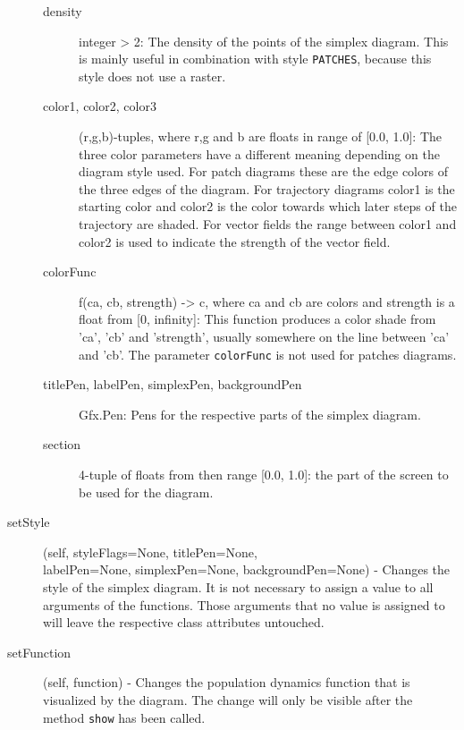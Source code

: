 \documentclass[12pt,a4paper,USenglish]{article}
\begin{document}
\begin{description}
\begin{description}
\item[density] integer > 2:  The density of the points of the simplex 
	diagram. This is mainly useful in combination with style {\tt PATCHES},
	because this style does not use a raster.

\item[color1, color2, color3] (r,g,b)-tuples, where r,g and b are
        floats in range of [0.0, 1.0]: The three color parameters have a
	different meaning depending on the diagram style used. 
	 For patch diagrams these
            are the edge colors of the three edges of the diagram. For
            trajectory diagrams color1 is the starting color and color2
            is the color towards which later steps of the trajectory are
            shaded. For vector fields the range between color1 and
            color2 is used to indicate the strength of the vector field. 

\item[colorFunc] f(ca, cb, strength) -> c, where ca and cb are colors
            and strength is a float from [0, infinity]: This function
            produces a color shade from 'ca', 'cb' and 'strength',
            usually somewhere on the line between 'ca' and 'cb'. The
            parameter {\tt colorFunc} is not used for patches diagrams.

\item[titlePen, labelPen, simplexPen, backgroundPen] Gfx.Pen: Pens
            for the respective parts of the simplex diagram.

\item[section] 4-tuple of floats from then range [0.0, 1.0]: the
            part of the screen to be used for the diagram. 

\end{description}

\item[setStyle] (self, styleFlags=None, titlePen=None,\\
  labelPen=None, simplexPen=None, backgroundPen=None) - Changes the
  style of the simplex diagram. It is not necessary to assign a value
  to all arguments of the functions. Those arguments that no value is
  assigned to will leave the respective class attributes untouched.

\item[setFunction] (self, function) - Changes the population dynamics
  function that is visualized by the diagram. The change will only be
  visible after the method {\tt show} has been called.


\end{description}
\end{document}
